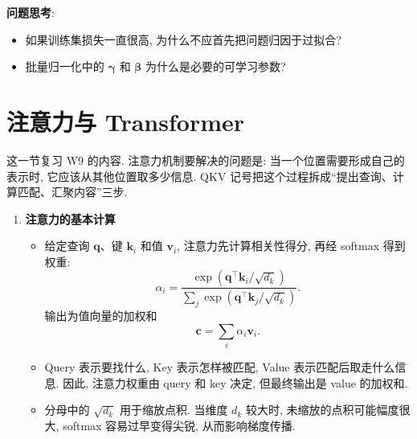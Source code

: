 \documentclass{../nndlcourse}
\begin{document}
\textbf{问题思考}:
\begin{itemize}
    \item 如果训练集损失一直很高, 为什么不应首先把问题归因于过拟合?
    \item 批量归一化中的 $\boldsymbol{\gamma}$ 和 $\boldsymbol{\beta}$ 为什么是必要的可学习参数?
\end{itemize}

\section{注意力与 Transformer}

这一节复习 W9 的内容. 注意力机制要解决的问题是: 当一个位置需要形成自己的表示时, 它应该从其他位置取多少信息. QKV 记号把这个过程拆成“提出查询、计算匹配、汇聚内容”三步.

\begin{enumerate}
    \item \textbf{注意力的基本计算}
    \begin{itemize}
        \item 给定查询 $\boldsymbol{q}$、键 $\boldsymbol{k}_i$ 和值 $\boldsymbol{v}_i$, 注意力先计算相关性得分, 再经 softmax 得到权重:
        \[
            \alpha_i
            =
            \frac{\exp(\boldsymbol{q}^{\top}\boldsymbol{k}_i/\sqrt{d_k})}
            {\sum_j\exp(\boldsymbol{q}^{\top}\boldsymbol{k}_j/\sqrt{d_k})}.
        \]
        输出为值向量的加权和
        \[
            \boldsymbol{c}
            =
            \sum_i \alpha_i\boldsymbol{v}_i.
        \]
        \item Query 表示要找什么, Key 表示怎样被匹配, Value 表示匹配后取走什么信息. 因此, 注意力权重由 query 和 key 决定, 但最终输出是 value 的加权和.
        
        \item 分母中的 $\sqrt{d_k}$ 用于缩放点积. 当维度 $d_k$ 较大时, 未缩放的点积可能幅度很大, softmax 容易过早变得尖锐, 从而影响梯度传播.
    \end{itemize}


\end{enumerate}
\end{document}

